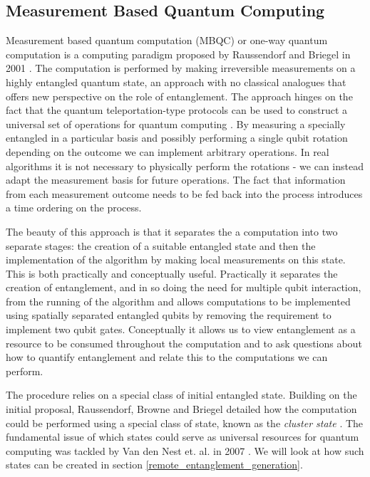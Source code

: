 \subsection{Measurement Based Quantum Computing}

Measurement based quantum computation (MBQC) \cite{mbqc_intro} or one-way quantum computation is a computing paradigm proposed by Raussendorf and Briegel in 2001 \cite{one_way_qc}.
The computation is performed by making irreversible measurements on a highly entangled quantum state, an approach with no classical analogues that offers new perspective on the role of entanglement.
The approach hinges on the fact that the quantum teleportation-type protocols can be used to construct a universal set of operations for quantum computing \cite{teleportation_universal}. By measuring a specially entangled in a particular basis and possibly performing a single qubit rotation depending on the outcome we can implement arbitrary operations. In real algorithms it is not necessary to physically perform the rotations - we can instead adapt the measurement basis for future operations. The fact that information from each measurement outcome needs to be fed back into the process introduces a time ordering on the process. 

The beauty of this approach is that it separates the a computation into two separate stages: the creation of a suitable entangled state and then the implementation of the algorithm by making local measurements on this state. This is both practically and conceptually useful. Practically it separates the creation of entanglement, and in so doing the need for multiple qubit interaction, from the running of the algorithm and allows computations to be implemented using spatially separated entangled qubits by removing the requirement to implement two qubit gates. Conceptually it allows us to view entanglement as a resource to be consumed throughout the computation and to ask questions about how to quantify entanglement and relate this to the computations we can perform.

The procedure relies on a special class of initial entangled state. Building on the initial proposal, Raussendorf, Browne and Briegel detailed how the computation could be performed using a special class of state, known as the \textit{cluster state} \cite{mbqc_cluster_03}. The fundamental issue of which states could serve as universal resources for quantum computing was tackled by Van den Nest et. al. in 2007 \cite{which_states_universal_resources}. We will look at how such states can be created in section \ref{remote_entanglement_generation}.

